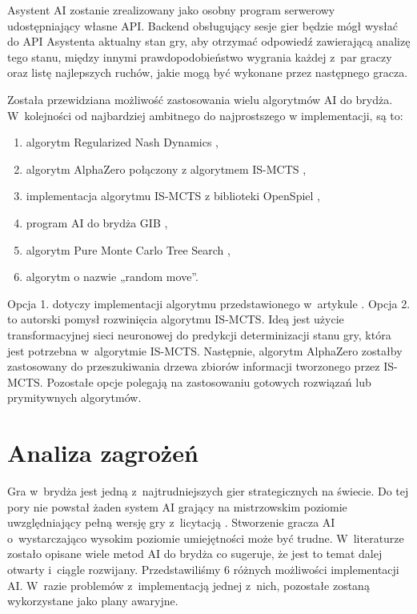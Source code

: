 Asystent AI zostanie zrealizowany jako osobny program serwerowy
udostępniający własne API. Backend obsługujący sesje gier
będzie mógł wysłać do API Asystenta aktualny stan gry, aby otrzymać
odpowiedź zawierającą analizę tego stanu, między innymi
prawdopodobieństwo wygrania każdej z~par graczy oraz listę
najlepszych ruchów, jakie mogą być wykonane przez następnego gracza.

Została przewidziana możliwość zastosowania wielu algorytmów AI
do brydża. W~kolejności od najbardziej ambitnego do
najprostszego w implementacji, są to:
\begin{enumerate}
  \item algorytm Regularized Nash Dynamics \cite{doi:10.1126/science.add4679},
  \item algorytm AlphaZero \cite{Silver2017MasteringCA} połączony
        z algorytmem IS-MCTS \cite{6203567},
  \item implementacja algorytmu IS-MCTS z biblioteki OpenSpiel \cite{LanctotEtAl2019OpenSpiel},
  \item program AI do brydża GIB \cite{Ginsberg1999GIBST},
  \item algorytm Pure Monte Carlo Tree Search \cite{pmcts},
  \item algorytm o nazwie „random move”.
\end{enumerate}

Opcja 1. dotyczy implementacji algorytmu przedstawionego w~artykule
\cite{doi:10.1126/science.add4679}.
Opcja 2. to autorski pomysł rozwinięcia algorytmu IS-MCTS.
Ideą jest użycie transformacyjnej sieci neuronowej do predykcji
determinizacji stanu gry, która jest potrzebna w~algorytmie IS-MCTS.
Następnie, algorytm AlphaZero zostałby zastosowany do przeszukiwania
drzewa zbiorów informacji tworzonego przez IS-MCTS.
Pozostałe opcje polegają na zastosowaniu gotowych rozwiązań lub
prymitywnych algorytmów.


\section{Analiza zagrożeń}

Gra w~brydża jest jedną z~najtrudniejszych gier strategicznych na świecie.
Do tej pory nie powstał żaden system AI grający na mistrzowskim poziomie
uwzględniający pełną wersję gry z~licytacją \cite{Bethe2021AdvancesIC}.
Stworzenie gracza AI o~wystarczająco wysokim poziomie umiejętności może być
trudne. W~literaturze zostało opisane wiele metod AI do brydża
\cite{Zhang2019DesignAD,Zhang2022TheSO,Zhang2022AIEB,Ginsberg1999GIBST}
co sugeruje, że jest to temat dalej otwarty i~ciągle rozwijany.
Przedstawiliśmy 6 różnych możliwości implementacji AI.
W~razie problemów z~implementacją jednej z~nich, pozostałe
zostaną wykorzystane jako plany awaryjne.


